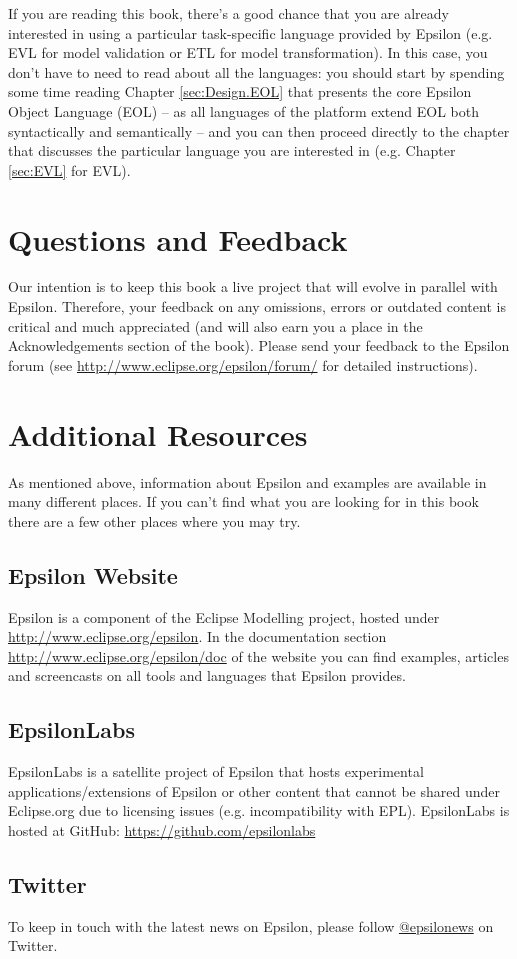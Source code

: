 If you are reading this book, there's a good chance that you are already interested in using a particular task-specific language provided by Epsilon (e.g. EVL for model validation or ETL for model transformation). In this case, you don't have to need to read about all the languages: you should start by spending some time reading Chapter \ref{sec:Design.EOL} that presents the core Epsilon Object Language (EOL) -- as all languages of the platform extend EOL both syntactically and semantically -- and you can then proceed directly to the chapter that discusses the particular language you are interested in (e.g. Chapter \ref{sec:EVL} for EVL).

\section{Questions and Feedback}

Our intention is to keep this book a live project that will evolve in parallel with Epsilon. Therefore, your feedback on any omissions, errors or outdated content is critical and much appreciated (and will also earn you a place in the Acknowledgements section of the book). Please send your feedback to the Epsilon forum  (see \url{http://www.eclipse.org/epsilon/forum/} for detailed instructions).

\section{Additional Resources}

As mentioned above, information about Epsilon and examples are available in many different places. If you can't find what you are looking for in this book there are a few other places where you may try.

\subsection{Epsilon Website}
Epsilon is a component of the Eclipse Modelling project, hosted under \url{http://www.eclipse.org/epsilon}. In the documentation section \url{http://www.eclipse.org/epsilon/doc} of the website you can find examples, articles and screencasts on all tools and languages that Epsilon provides.

\subsection{EpsilonLabs}

EpsilonLabs is a satellite project of Epsilon that hosts experimental applications/extensions of Epsilon or other content that cannot be shared under Eclipse.org due to licensing issues (e.g. incompatibility with EPL). EpsilonLabs is hosted at GitHub: \url{https://github.com/epsilonlabs}

\subsection{Twitter}
To keep in touch with the latest news on Epsilon, please follow \href{http://twitter.com/#!/epsilonews}{@epsilonews} on Twitter.